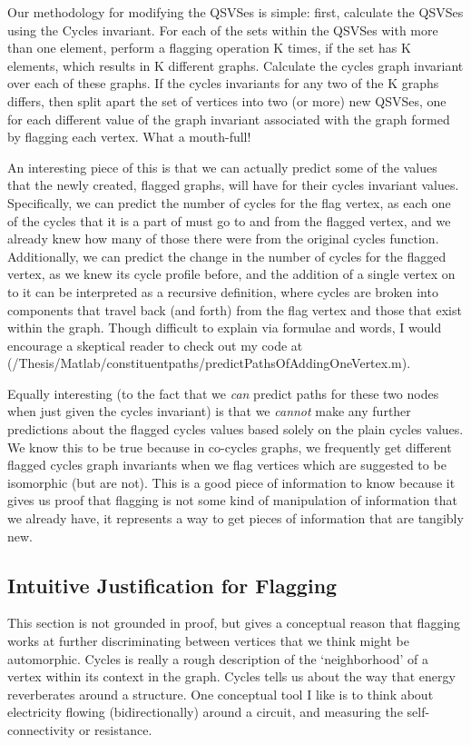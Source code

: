 Our methodology for modifying the QSVSes is simple: first, calculate the QSVSes using the Cycles invariant.
For each of the sets within the QSVSes with more than one element, perform a flagging operation K times, if the set has K elements, which results in K different graphs.
Calculate the cycles graph invariant over each of these graphs.
If the cycles invariants for any two of the K graphs differs, then split apart the set of vertices into two (or more) new QSVSes, one for each different value of the graph invariant associated with the graph formed by flagging each vertex.
What a mouth-full!

An interesting piece of this is that we can actually predict some of the values that the newly created, flagged graphs, will have for their cycles invariant values.
Specifically, we can predict the number of cycles for the flag vertex, as each one of the cycles that it is a part of must go to and from the flagged vertex, and we already knew how many of those there were from the original cycles function.
Additionally, we can predict the change in the number of cycles for the flagged vertex, as we knew its cycle profile before, and the addition of a single vertex on to it can be interpreted as a recursive definition, where cycles are broken into components that travel back (and forth) from the flag vertex and those that exist within the graph.
Though difficult to explain via formulae and words, I would encourage a skeptical reader to check out my code at (/Thesis/Matlab/constituentpaths/predictPathsOfAddingOneVertex.m).

Equally interesting (to the fact that we \emph{can} predict paths for these two nodes when just given the cycles invariant) is that we \emph{cannot} make any further predictions about the flagged cycles values based solely on the plain cycles values.
We know this to be true because in co-cycles graphs, we frequently get different flagged cycles graph invariants when we flag vertices which are suggested to be isomorphic (but are not).
This is a good piece of information to know because it gives us proof that flagging is not some kind of manipulation of information that we already have, it represents a way to get pieces of information that are tangibly new.

\subsection{Intuitive Justification for Flagging}

This section is not grounded in proof, but gives a conceptual reason that flagging works at further discriminating between vertices that we think might be automorphic.
Cycles is really a rough description of the `neighborhood' of a vertex within its context in the graph.
Cycles tells us about the way that energy reverberates around a structure.
One conceptual tool I like is to think about electricity flowing (bidirectionally) around a circuit, and measuring the self-connectivity or resistance.

